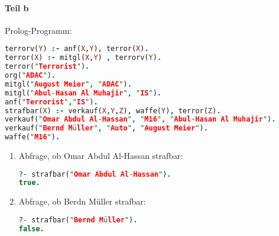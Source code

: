 \paragraph*{Teil b}
Prolog-Programm:
\begin{lstlisting}[language=Prolog]
terrorv(Y) :- anf(X,Y), terror(X).
terror(X) :- mitgl(X,Y) , terrorv(Y).
terror("Terrorist").
org("ADAC").
mitgl("August Meier", "ADAC").
mitgl("Abul-Hasan Al Muhajir", "IS").
anf("Terrorist","IS").
strafbar(X) :- verkauf(X,Y,Z), waffe(Y), terror(Z).
verkauf("Omar Abdul Al-Hassan", "M16", "Abul-Hasan Al Muhajir").
verkauf("Bernd Müller", "Auto", "August Meier").
waffe("M16").
\end{lstlisting}
\begin{enumerate}[label=(\roman*)]
\item Abfrage, ob Omar Abdul Al-Hassan strafbar:
\begin{lstlisting}[language=Prolog]
?- strafbar("Omar Abdul Al-Hassan").
true.
\end{lstlisting}
\item Abfrage, ob Berdn Müller strafbar:
\begin{lstlisting}[language=Prolog]
?- strafbar("Bernd Müller").
false.
\end{lstlisting}
\end{enumerate}
